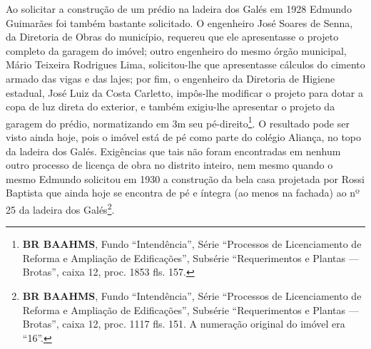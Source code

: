 Ao solicitar a construção de um prédio na ladeira dos Galés em 1928 Edmundo Guimarães foi também bastante solicitado. O engenheiro José Soares de Senna, da Diretoria de Obras do município, requereu que ele apresentasse o projeto completo da garagem do imóvel; outro engenheiro do mesmo órgão municipal, Mário Teixeira Rodrigues Lima, solicitou-lhe que apresentasse cálculos do cimento armado das vigas e das lajes; por fim, o engenheiro da Diretoria de Higiene estadual, José Luiz da Costa Carletto, impôs-lhe modificar o projeto para dotar a copa de luz direta do exterior, e também exigiu-lhe apresentar o projeto da garagem do prédio, normatizando em 3m seu pé-direito\footnote{\textbf{BR BAAHMS}, Fundo ``Intendência'', Série ``Processos de Licenciamento de Reforma e Ampliação de Edificações'', Subsérie ``Requerimentos e Plantas --- Brotas'', caixa 12, proc. 1853 fls. 157.}. O resultado pode ser visto ainda hoje, pois o imóvel está de pé como parte do colégio Aliança, no topo da ladeira dos Galés. Exigências que tais não foram encontradas em nenhum outro processo de licença de obra no distrito inteiro, nem mesmo quando o mesmo Edmundo solicitou em 1930 a construção da bela casa projetada por Rossi Baptista que ainda hoje se encontra de pé e íntegra (ao menos na fachada) ao nº 25 da ladeira dos Galés\footnote{\textbf{BR BAAHMS}, Fundo ``Intendência'', Série ``Processos de Licenciamento de Reforma e Ampliação de Edificações'', Subsérie ``Requerimentos e Plantas --- Brotas'', caixa 12, proc. 1117 fls. 151. A numeração original do imóvel era ``16''.}.

